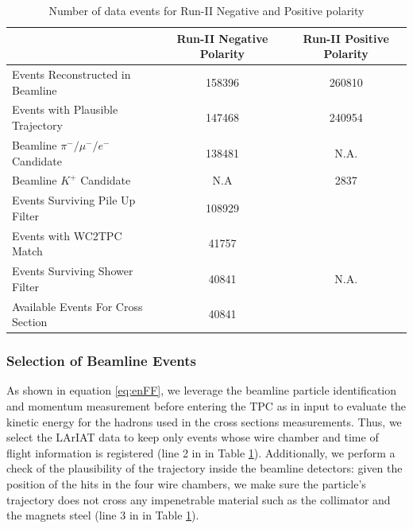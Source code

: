 \begin{table}[b]
\centering
\begin{tabular}{|l|c|c|}
\hline
                                                        & Run-II Negative Polarity   &  Run-II Positive Polarity  \\ \hline
Events Reconstructed in Beamline        &  158396  & 260810  \\ \hline
Events with Plausible Trajectory            &   147468 & 240954  \\ \hline
Beamline $\pi^-/\mu^-/e^-$  Candidate  &   138481 &     N.A.   \\ \hline
Beamline $K^+$   Candidate                 &    N.A       & 2837     \\ \hline
Events Surviving Pile Up Filter              &   108929  &              \\ \hline
Events with WC2TPC Match                 &    41757   &              \\ \hline
Events Surviving Shower Filter             &    40841    &  N.A.     \\ \hline
Available Events For Cross Section      &   40841    &       \\ \hline
\end{tabular}
\caption{Number of data events for Run-II Negative and Positive polarity }
\label{tab:beamlineDataSelection}
\end{table}


\subsubsection{Selection of Beamline Events}\label{ch:beamlineDetectorsData}
As shown in equation \ref{eq:enFF}, we leverage the beamline particle identification and momentum measurement before entering the TPC as in input to evaluate the kinetic energy for the hadrons used in the  cross sections measurements. Thus, we select the LArIAT data to keep only events whose wire chamber and time of flight information is registered (line 2 in in Table \ref{tab:beamlineDataSelection}). Additionally, we perform a check of the plausibility of the trajectory inside the beamline detectors: given the position of the hits in the four wire chambers, we make sure the particle's trajectory does not cross any impenetrable material such as the collimator and the magnets steel (line 3 in in Table \ref{tab:beamlineDataSelection}).


